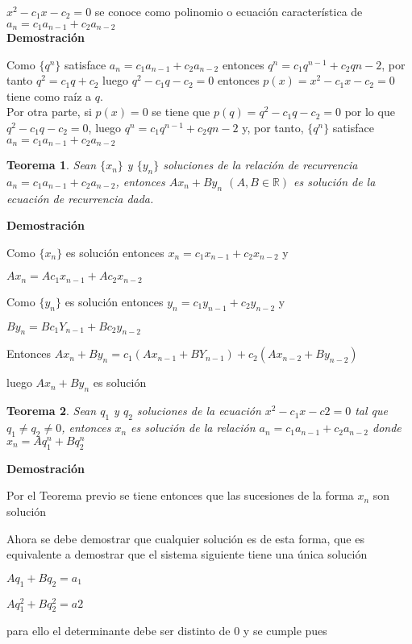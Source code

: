 \documentclass[a4paper,12pt]{report}
\newtheorem*{teo}{Teorema}
\begin{document}
  $x^2-c_1x-c_2=0$ se conoce como polinomio o ecuación característica de $a_n=c_1a_{n-1}+c_2a_{n-2}$ \\

  
   \textbf{Demostración}

   Como $\{q^n\}$ satisface $a_n=c_1a_{n-1}+c_2a_{n-2}$ entonces $q^n=c_1q^{n-1}+c_2q{n-2}$, por tanto
   $q^2=c_1q+c_2$ luego  $q^2-c_1q-c_2=0$ entonces $p(x)=x^2-c_1x-c_2=0$ tiene como raíz a $q$.\\
   
   Por otra parte, si $p(x)=0$ se tiene que $p(q)=q^2-c_1q-c_2=0$ por lo que $q^2-c_1q-c_2=0$, luego $q^n=c_1q^{n-1}+c_2q{n-2}$ y, por tanto, $\{q^n\}$ satisface $a_n=c_1a_{n-1}+c_2a_{n-2}$
   
\begin{teo}
 Sean $\{x_n\}$ y $\{y_n\}$ soluciones de la relación de recurrencia\\ 
 $a_n=c_1a_{n-1}+c_2a_{n-2}$, entonces $Ax_n + By_n$  $(A,B\in\mathbb{R})$ es solución de la ecuación de recurrencia dada.
\end{teo}

\textbf{Demostración}

Como $\{x_n\}$ es solución entonces $x_n=c_1x_{n-1}+c_2x_{n-2}$ y

$Ax_n=Ac_1x_{n-1}+Ac_2x_{n-2}$

Como $\{y_n\}$ es solución entonces $y_n=c_1y_{n-1}+c_2y_{n-2}$ y

$By_n=Bc_1Y_{n-1}+Bc_2y_{n-2}$

Entonces $Ax_n+By_n=c_1(Ax_{n-1}+BY_{n-1})+c_2(Ax_{n-2}+By_{n-2})$

luego $Ax_n+By_n$ es solución

\begin{teo}
 Sean $q_1$ y $q_2$ soluciones de la ecuación $x^2-c_1x-c2=0$ tal que $q_1\neq q_2 \neq 0$, entonces $x_n$ es solución de la relación $a_n=c_1a_{n-1}+c_2a_{n-2}$ donde $x_n=Aq^n_1+Bq^n_2$
\end{teo}

\textbf{Demostración}

Por el Teorema previo se tiene entonces que las sucesiones de la forma $x_n$ son solución

Ahora se debe demostrar que cualquier solución es de esta forma, que es equivalente a demostrar que el sistema siguiente tiene una única solución

$Aq_1+Bq_2=a_1$

$Aq^2_1+Bq^2_2=a2$

para ello el determinante debe ser distinto de 0 y se cumple pues
\end{document}
